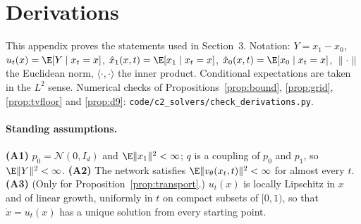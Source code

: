 \section{Derivations}\label{app:derivations}
This appendix proves the statements used in Section~3. Notation: $Y=x_1-x_0$, $u_t(x)=\E[Y\mid x_t=x]$, $\hat x_1(x,t)=\E[x_1\mid x_t=x]$, $\hat x_0(x,t)=\E[x_0\mid x_t=x]$, $\|\cdot\|$ the Euclidean norm, $\langle\cdot,\cdot\rangle$ the inner product. Conditional expectations are taken in the $L^2$ sense. Numerical checks of Propositions~\ref{prop:bound}, \ref{prop:grid}, \ref{prop:tvfloor} and \ref{prop:d9}: \texttt{code/c2\_solvers/check\_derivations.py}.

\paragraph{Standing assumptions.}
\textbf{(A1)} $p_0=\mathcal N(0,I_d)$ and $\E\|x_1\|^2<\infty$; $q$ is a coupling of $p_0$ and $p_1$, so $\E\|Y\|^2<\infty$.
\textbf{(A2)} The network satisfies $\E\|v_\theta(x_t,t)\|^2<\infty$ for almost every $t$.
\textbf{(A3)} (Only for Proposition~\ref{prop:transport}.) $u_t(x)$ is locally Lipschitz in $x$ and of linear growth, uniformly in $t$ on compact subsets of $[0,1)$, so that $\dot x=u_t(x)$ has a unique solution from every starting point.

